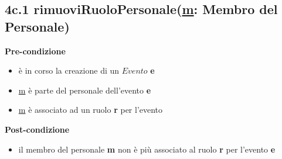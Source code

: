 \documentclass[12pt]{extarticle}
\begin{document}
\subsection*{4c.1 rimuoviRuoloPersonale(\underline{m}: Membro del Personale)}
\textbf{Pre-condizione}
\begin{itemize}
  \item è in corso la creazione di un $Evento$ \textbf{e}
  \item \underline{m} è parte del personale dell'evento \textbf{e}
  \item \underline{m} è associato ad un ruolo \textbf{r} per l'evento
\end{itemize}
\textbf{Post-condizione}
\begin{itemize}
  \item il membro del personale \textbf{m} non è più associato al ruolo \textbf{r} per l'evento \textbf{e} 
\end{itemize}
\end{document}
